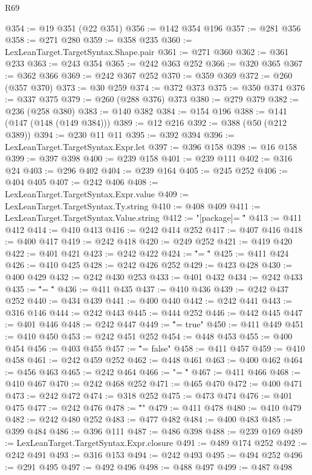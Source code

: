 \begin{lexlean}{R69}
\begin{coremodule}
@354 := @19 @351 (@22 @351)
@356 := @142 @354 @196
@357 := @281 @356
@358 := @271 @280
@359 := @358 @235
@360 := LexLeanTarget.TargetSyntax.Shape.pair
@361 := @271 @360
@362 := @361 @233
@363 := @243 @354
@365 := @242 @363 @252
@366 := @320 @365
@367 := @362 @366
@369 := @242 @367 @252
@370 := @359 @369
@372 := @260 (@357 @370)
@373 := @30 @259
@374 := @372 @373
@375 := @350 @374
@376 := @337 @375
@379 := @260 (@288 @376) @373
@380 := @279 @379
@382 := @236 (@258 @380)
@383 := @140 @382
@384 := @154 @196
@388 := @141 (@147 (@148 (@149 @384)))
@389 := @12 @216
@392 := @388 (@50 (@212 @389))
@394 := @230 @11 @11
@395 := @392 @394
@396 := LexLeanTarget.TargetSyntax.Expr.let
@397 := @396 @158
@398 := @16 @158
@399 := @397 @398
@400 := @239 @158
@401 := @239 @111
@402 := @316 @24
@403 := @296 @402
@404 := @239 @164
@405 := @245 @252
@406 := @404 @405
@407 := @242 @406
@408 := LexLeanTarget.TargetSyntax.Expr.value
@409 := LexLeanTarget.TargetSyntax.Ty.string
@410 := @408 @409
@411 := LexLeanTarget.TargetSyntax.Value.string
@412 := "[package]\nname = \""
@413 := @411 @412
@414 := @410 @413
@416 := @242 @414 @252
@417 := @407 @416
@418 := @400 @417
@419 := @242 @418
@420 := @249 @252
@421 := @419 @420
@422 := @401 @421
@423 := @242 @422
@424 := "\"\nversion = \""
@425 := @411 @424
@426 := @410 @425
@428 := @242 @426 @252
@429 := @423 @428
@430 := @400 @429
@432 := @242 @430 @253
@433 := @401 @432
@434 := @242 @433
@435 := "\"\nedition = \""
@436 := @411 @435
@437 := @410 @436
@439 := @242 @437 @252
@440 := @434 @439
@441 := @400 @440
@442 := @242 @441
@443 := @316 @146
@444 := @242 @443
@445 := @444 @252
@446 := @442 @445
@447 := @401 @446
@448 := @242 @447
@449 := "\"\npublish = true"
@450 := @411 @449
@451 := @410 @450
@453 := @242 @451 @252
@454 := @448 @453
@455 := @400 @454
@456 := @403 @455
@457 := "\"\npublish = false"
@458 := @411 @457
@459 := @410 @458
@461 := @242 @459 @252
@462 := @448 @461
@463 := @400 @462
@464 := @456 @463
@465 := @242 @464
@466 := "\n\n[lib]\npath = \""
@467 := @411 @466
@468 := @410 @467
@470 := @242 @468 @252
@471 := @465 @470
@472 := @400 @471
@473 := @242 @472
@474 := @318 @252
@475 := @473 @474
@476 := @401 @475
@477 := @242 @476
@478 := "\"\n{}\n"
@479 := @411 @478
@480 := @410 @479
@482 := @242 @480 @252
@483 := @477 @482
@484 := @400 @483
@485 := @399 @484
@486 := @396 @111
@487 := @486 @398
@488 := @239 @169
@489 := LexLeanTarget.TargetSyntax.Expr.closure
@491 := @489 @174 @252
@492 := @242 @491
@493 := @316 @153
@494 := @242 @493
@495 := @494 @252
@496 := @291 @495
@497 := @492 @496
@498 := @488 @497
@499 := @487 @498

\end{coremodule}
\end{lexlean}
